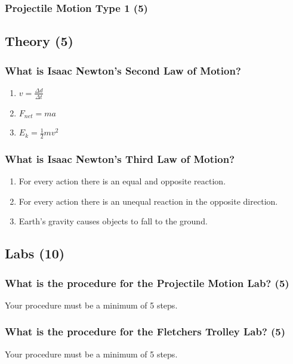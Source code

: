 \documentclass{article}
\begin{document}
\subsubsection{Projectile Motion Type 1 (5)}

\subsection{Theory (5)}
\subsubsection{What is Isaac Newton's Second Law of Motion?}
\begin{enumerate}[label=\alph*)]
    \item $v = \frac{\Delta d}{\Delta t}$
    \item $F_{net} = ma$
    \item $E_{k} = \frac{1}{2}mv^2$
\end{enumerate}
\subsubsection{What is Isaac Newton's Third Law of Motion?}
\begin{enumerate}[label=\alph*)]
    \item For every action there is an equal and opposite reaction.
    \item For every action there is an unequal reaction in the opposite direction.
    \item Earth's gravity causes objects to fall to the ground.
\end{enumerate}

\subsection{Labs (10)}
\subsubsection{What is the procedure for the Projectile Motion Lab? (5)}
Your procedure must be a minimum of 5 steps.

\subsubsection{What is the procedure for the Fletchers Trolley Lab? (5)}
Your procedure must be a minimum of 5 steps.\\

\end{document}
